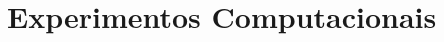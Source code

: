 \documentclass[a4paper,11pt]{article}
\begin{document}



\section{Experimentos Computacionais}
\label{secExp}
\end{document}
